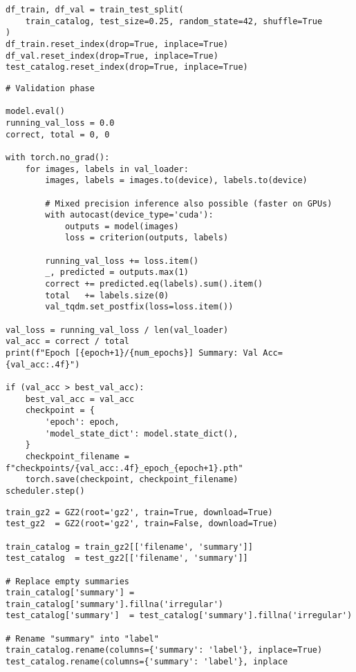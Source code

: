 \begin{samepage}
\begin{lstlisting}[style=mypython, caption={Dataset partitioning code example}, label={lst:data-split}]
df_train, df_val = train_test_split(
    train_catalog, test_size=0.25, random_state=42, shuffle=True
)
df_train.reset_index(drop=True, inplace=True)
df_val.reset_index(drop=True, inplace=True)
test_catalog.reset_index(drop=True, inplace=True)
\end{lstlisting}
\end{samepage}

\newpage

\begin{samepage}
\begin{lstlisting}[style=mypython, caption={Validation loop code example}, label={lst:loop-val}]
# Validation phase

model.eval()
running_val_loss = 0.0
correct, total = 0, 0

with torch.no_grad():
    for images, labels in val_loader:
        images, labels = images.to(device), labels.to(device)
        
        # Mixed precision inference also possible (faster on GPUs)
        with autocast(device_type='cuda'):
            outputs = model(images)
            loss = criterion(outputs, labels)
        
        running_val_loss += loss.item()
        _, predicted = outputs.max(1)
        correct += predicted.eq(labels).sum().item()
        total   += labels.size(0)
        val_tqdm.set_postfix(loss=loss.item())

val_loss = running_val_loss / len(val_loader)
val_acc = correct / total
print(f"Epoch [{epoch+1}/{num_epochs}] Summary: Val Acc={val_acc:.4f}")

if (val_acc > best_val_acc):
    best_val_acc = val_acc
    checkpoint = {
        'epoch': epoch,
        'model_state_dict': model.state_dict(),
    }
    checkpoint_filename = f"checkpoints/{val_acc:.4f}_epoch_{epoch+1}.pth"
    torch.save(checkpoint, checkpoint_filename)
scheduler.step()
\end{lstlisting}
\end{samepage}

\begin{samepage}
\begin{lstlisting}[style=mypython, caption={Dataset load code example}, label={lst:data-load}]
train_gz2 = GZ2(root='gz2', train=True, download=True)
test_gz2  = GZ2(root='gz2', train=False, download=True)

train_catalog = train_gz2[['filename', 'summary']]
test_catalog  = test_gz2[['filename', 'summary']]

# Replace empty summaries
train_catalog['summary'] = train_catalog['summary'].fillna('irregular')
test_catalog['summary']  = test_catalog['summary'].fillna('irregular')

# Rename "summary" into "label"
train_catalog.rename(columns={'summary': 'label'}, inplace=True)
test_catalog.rename(columns={'summary': 'label'}, inplace
\end{lstlisting}
\end{samepage}

